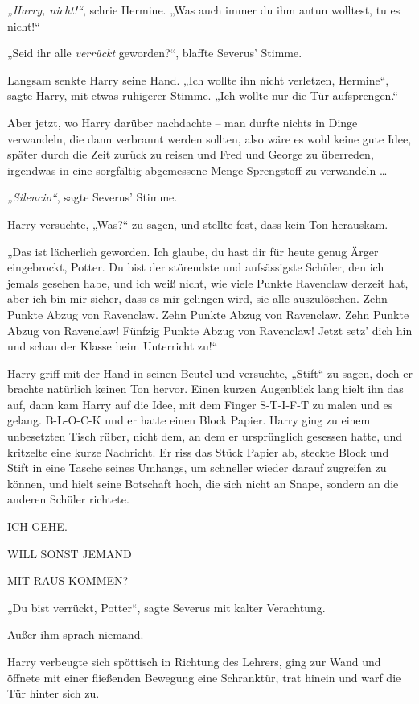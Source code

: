 {\emph{„Harry, nicht!“}, schrie Hermine. „Was auch immer du ihm antun wolltest, tu es nicht!“

„Seid ihr alle \emph{verrückt} geworden?“, blaffte Severus' Stimme.

Langsam senkte Harry seine Hand. „Ich wollte ihn nicht verletzen, Hermine“, sagte Harry, mit etwas ruhigerer Stimme. „Ich wollte nur die Tür aufsprengen.“

Aber jetzt, wo Harry darüber nachdachte -- man durfte nichts in Dinge verwandeln, die dann verbrannt werden sollten, also wäre es wohl keine gute Idee, später durch die Zeit zurück zu reisen und Fred und George zu überreden, irgendwas in eine sorgfältig abgemessene Menge Sprengstoff zu verwandeln …

\emph{„Silencio“}, sagte Severus' Stimme.

Harry versuchte, „Was?“ zu sagen, und stellte fest, dass kein Ton herauskam.

„Das ist lächerlich geworden. Ich glaube, du hast dir für heute genug Ärger eingebrockt, Potter. Du bist der störendste und aufsässigste Schüler, den ich jemals gesehen habe, und ich weiß nicht, wie viele Punkte Ravenclaw derzeit hat, aber ich bin mir sicher, dass es mir gelingen wird, sie alle auszulöschen. Zehn Punkte Abzug von Ravenclaw. Zehn Punkte Abzug von Ravenclaw. Zehn Punkte Abzug von Ravenclaw! Fünfzig Punkte Abzug von Ravenclaw! Jetzt setz' dich hin und schau der Klasse beim Unterricht zu!“

Harry griff mit der Hand in seinen Beutel und versuchte, „Stift“ zu sagen, doch er brachte natürlich keinen Ton hervor. Einen kurzen Augenblick lang hielt ihn das auf, dann kam Harry auf die Idee, mit dem Finger S-T-I-F-T zu malen und es gelang. B-L-O-C-K und er hatte einen Block Papier. Harry ging zu einem unbesetzten Tisch rüber, nicht dem, an dem er ursprünglich gesessen hatte, und kritzelte eine kurze Nachricht. Er riss das Stück Papier ab, steckte Block und Stift in eine Tasche seines Umhangs, um schneller wieder darauf zugreifen zu können, und hielt seine Botschaft hoch, die sich nicht an Snape, sondern an die anderen Schüler richtete.

ICH GEHE.

WILL SONST JEMAND

MIT RAUS KOMMEN?

„Du bist verrückt, Potter“, sagte Severus mit kalter Verachtung.

Außer ihm sprach niemand.

Harry verbeugte sich spöttisch in Richtung des Lehrers, ging zur Wand und öffnete mit einer fließenden Bewegung eine Schranktür, trat hinein und warf die Tür hinter sich zu.

}
